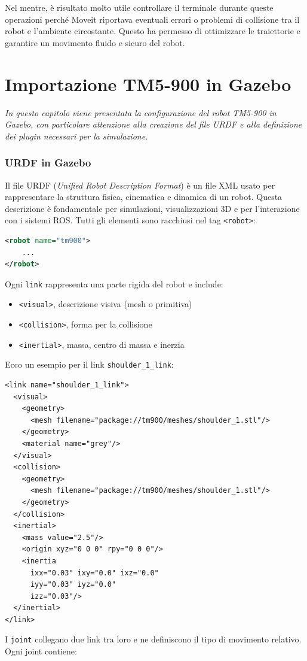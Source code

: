 \documentclass[11pt]{report}
\begin{document}
Nel mentre, è risultato molto utile controllare il terminale durante queste operazioni perché Moveit riportava eventuali errori o problemi di collisione tra il robot e l'ambiente circostante. Questo ha permesso di ottimizzare le traiettorie e garantire un movimento fluido e sicuro del robot.

\section{Importazione TM5-900 in Gazebo}
\label{sec:Importazione_TM5-900_Gazebo}
\textit{In questo capitolo viene presentata la configurazione del robot TM5-900 in Gazebo, con particolare attenzione alla creazione del file URDF e alla definizione dei plugin necessari per la simulazione.}
\subsubsection{URDF in Gazebo}
Il file URDF (\textit{Unified Robot Description Format}) è un file XML usato per rappresentare la struttura fisica, cinematica e dinamica di un robot. Questa descrizione è fondamentale per simulazioni, visualizzazioni 3D e per l'interazione con i sistemi ROS.
\newline
Tutti gli elementi sono racchiusi nel tag \texttt{<robot>}:

\begin{lstlisting}[language=xml]
<robot name="tm900">
    ...
</robot>
\end{lstlisting}
\vspace{1em}
Ogni \texttt{link} rappresenta una parte rigida del robot e include:

\begin{itemize}
    \item \texttt{<visual>}, descrizione visiva (mesh o primitiva)
    \item \texttt{<collision>}, forma per la collisione
    \item \texttt{<inertial>}, massa, centro di massa e inerzia
\end{itemize}

Ecco un esempio per il link \texttt{shoulder\_1\_link}:

\begin{verbatim}
<link name="shoulder_1_link">
  <visual>
    <geometry>
      <mesh filename="package://tm900/meshes/shoulder_1.stl"/>
    </geometry>
    <material name="grey"/>
  </visual>
  <collision>
    <geometry>
      <mesh filename="package://tm900/meshes/shoulder_1.stl"/>
    </geometry>
  </collision>
  <inertial>
    <mass value="2.5"/>
    <origin xyz="0 0 0" rpy="0 0 0"/>
    <inertia
      ixx="0.03" ixy="0.0" ixz="0.0"
      iyy="0.03" iyz="0.0"
      izz="0.03"/>
  </inertial>
</link>
\end{verbatim}
\vspace{1em}
I \texttt{joint} collegano due link tra loro e ne definiscono il tipo di movimento relativo. Ogni joint contiene:
\end{document}
